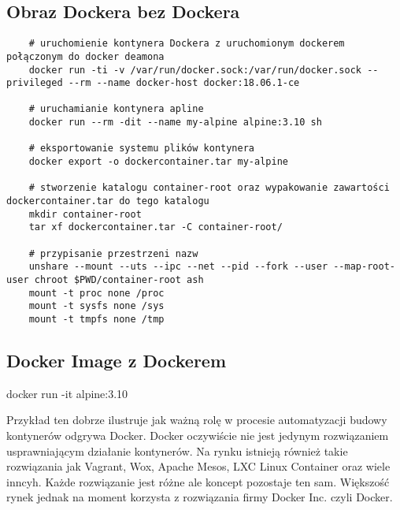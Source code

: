 \subsection{Obraz Dockera bez Dockera}
\begin{lstlisting}
    # uruchomienie kontynera Dockera z uruchomionym dockerem połączonym do docker deamona
    docker run -ti -v /var/run/docker.sock:/var/run/docker.sock --privileged --rm --name docker-host docker:18.06.1-ce

    # uruchamianie kontynera apline 
    docker run --rm -dit --name my-alpine alpine:3.10 sh

    # eksportowanie systemu plików kontynera
    docker export -o dockercontainer.tar my-alpine

    # stworzenie katalogu container-root oraz wypakowanie zawartości dockercontainer.tar do tego katalogu
    mkdir container-root
    tar xf dockercontainer.tar -C container-root/

    # przypisanie przestrzeni nazw
    unshare --mount --uts --ipc --net --pid --fork --user --map-root-user chroot $PWD/container-root ash 
    mount -t proc none /proc
    mount -t sysfs none /sys
    mount -t tmpfs none /tmp

\end{lstlisting}

\subsection{Docker Image z Dockerem}
docker run -it alpine:3.10

Przykład ten dobrze ilustruje jak ważną rolę w procesie automatyzacji budowy kontynerów odgrywa Docker.
Docker oczywiście nie jest jedynym rozwiązaniem usprawniającym działanie kontynerów. Na rynku istnieją również takie rozwiązania jak Vagrant, Wox, Apache Mesos, LXC Linux Container oraz wiele inncyh. Każde rozwiązanie jest różne ale koncept pozostaje ten sam. Większość rynek jednak na moment korzysta z rozwiązania firmy Docker Inc. czyli Docker.


